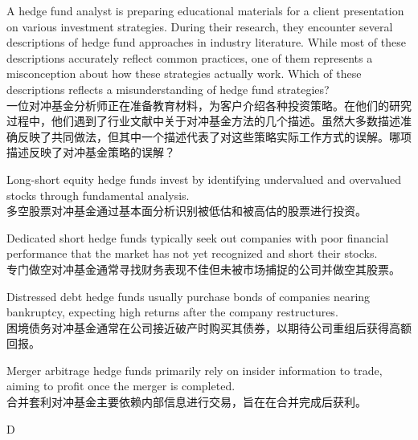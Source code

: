 \documentclass{article}
\newcounter{question} %
\begin{document}
\begin{question}
    A hedge fund analyst is preparing educational materials for a client presentation on various investment strategies. During their research, they encounter several descriptions of hedge fund approaches in industry literature. While most of these descriptions accurately reflect common practices, one of them represents a misconception about how these strategies actually work. Which of these descriptions reflects a misunderstanding of hedge fund strategies?\\
    一位对冲基金分析师正在准备教育材料，为客户介绍各种投资策略。在他们的研究过程中，他们遇到了行业文献中关于对冲基金方法的几个描述。虽然大多数描述准确反映了共同做法，但其中一个描述代表了对这些策略实际工作方式的误解。哪项描述反映了对冲基金策略的误解？
\end{question}
\begin{choices}
    \item Long-short equity hedge funds invest by identifying undervalued and overvalued stocks through fundamental analysis.\\
    多空股票对冲基金通过基本面分析识别被低估和被高估的股票进行投资。
    \item Dedicated short hedge funds typically seek out companies with poor financial performance that the market has not yet recognized and short their stocks.\\
    专门做空对冲基金通常寻找财务表现不佳但未被市场捕捉的公司并做空其股票。
    \item Distressed debt hedge funds usually purchase bonds of companies nearing bankruptcy, expecting high returns after the company restructures.\\
    困境债务对冲基金通常在公司接近破产时购买其债券，以期待公司重组后获得高额回报。
    \item Merger arbitrage hedge funds primarily rely on insider information to trade, aiming to profit once the merger is completed.\\
    合并套利对冲基金主要依赖内部信息进行交易，旨在在合并完成后获利。
\end{choices}

\begin{correctanswer}
    D
\end{correctanswer}
\end{document}
